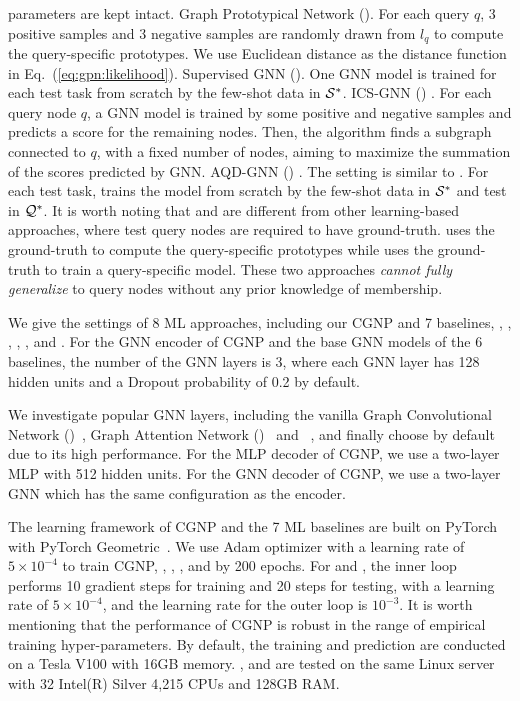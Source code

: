 parameters are kept intact.
%
 Graph Prototypical Network (\PN).  For each query $q$, 3
positive samples and 3 negative samples are randomly drawn from $l_q$
to compute the query-specific prototypes. We use Euclidean distance as
the distance function in Eq.~(\ref{eq:gpn:likelihood}).
%
 Supervised GNN (\Supervise). One GNN model is trained for
each test task from scratch by the few-shot data in $\mathcal{S}^*$.
%
 ICS-GNN (\ICSGNN) \cite{ICSGNN}. For each query node $q$, a
GNN model is trained by some positive and negative samples and
predicts a score for the remaining nodes.  Then, the algorithm finds a
subgraph connected to $q$, with a fixed number of nodes, aiming to
maximize the summation of the scores predicted by GNN.
%
 AQD-GNN (\AQDGNN) \cite{AQDGNN}. The setting is similar
to \Supervise. For each test task, \AQDGNN trains the model from
scratch by the few-shot data in $\mathcal{S}^*$ and test in $\mathcal{Q}^*$.
It is worth noting that \PN and \ICSGNN are different
from other learning-based approaches, where test query nodes are
required to have ground-truth. \PN uses the ground-truth to compute
the query-specific prototypes while \ICSGNN uses the ground-truth to
train a query-specific model.  These two approaches \emph{cannot fully
  generalize} to query nodes without any prior knowledge of
membership.


We give the settings of 8 ML approaches, including our CGNP and 7 baselines, \MAML, \Reptile, \Featrans, \PN, \Supervise, \ICSGNN and \AQDGNN.
For the GNN encoder of CGNP and the base GNN models of the 6 baselines, the number of the GNN layers is 3, where each GNN layer has 128 hidden units and a Dropout probability of 0.2 by default.

We investigate popular GNN layers, including the vanilla Graph Convolutional Network (\GCN)~\cite{GCN}, Graph Attention Network (\GAT)~\cite{GAT} and \SAGE~\cite{SAGE}, and finally choose 
\GAT by default due to its high performance. 
For the MLP decoder of CGNP, we use a two-layer MLP with 512 hidden units. 
For the GNN decoder of CGNP, we use a two-layer GNN which has the same configuration as the encoder. 

The learning framework of CGNP and the 7 ML baselines are built on
PyTorch~\cite{pytorch} with PyTorch Geometric~\cite{torchgeo}.
We use Adam optimizer with a learning rate of $5 \times
  10^{-4}$ to train CGNP, \PN, \ICSGNN, \Supervise, and \Featrans by
  200 epochs.  For \MAML and \Reptile, the inner loop performs 10
  gradient steps for training and 20 steps for testing, with a
  learning rate of $5\times 10^{-4}$, and the learning rate for the
  outer loop is $10^{-3}$.
It is worth mentioning that the performance of CGNP is robust in the
range of empirical training hyper-parameters.  By default, the
training and prediction are conducted on a Tesla V100 with 16GB
memory.  \ATC, \ACQ and \CTC are tested on the same Linux server with
32 Intel(R) Silver 4,215 CPUs and 128GB RAM.

